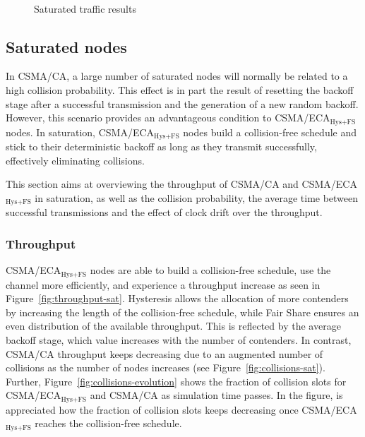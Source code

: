 \begin{figure}[tb]
		\\
		\caption{Saturated traffic results}
		\label{fig:satTest}
	\end{figure}


	\subsection{Saturated nodes}\label{resultsSaturated}
	In CSMA/CA, a large number of saturated nodes will normally be related to a high collision probability. This effect is in part the result of resetting the backoff stage after a successful transmission and the generation of a new random backoff. However, this scenario provides an advantageous condition to CSMA/ECA$_{\text{Hys+FS}}$ nodes. In saturation, CSMA/ECA$_{\text{Hys+FS}}$ nodes build a collision-free schedule and stick to their deterministic backoff as long as they transmit successfully, effectively eliminating collisions.
	
	This section aims at overviewing the throughput of CSMA/CA and CSMA/ECA$_{\text{Hys+FS}}$ in saturation, as well as the collision probability, the average time between successful transmissions and the effect of clock drift over the throughput.
	\\
	\subsubsection{Throughput}
	CSMA/ECA$_{\text{Hys+FS}}$ nodes are able to build a collision-free schedule, use the channel more efficiently, and experience a throughput increase as seen in Figure~\ref{fig:throughput-sat}. Hysteresis allows the allocation of more contenders by increasing the length of the collision-free schedule, while Fair Share ensures an even distribution of the available throughput. This is reflected by the average backoff stage, which value increases with the number of contenders. In contrast, CSMA/CA throughput keeps decreasing due to an augmented number of collisions as the number of nodes increases (see Figure~\ref{fig:collisions-sat}). Further, Figure~\ref{fig:collisions-evolution} shows the fraction of collision slots for CSMA/ECA$_{\text{Hys+FS}}$ and CSMA/CA as simulation time passes. In the figure, is appreciated how the fraction of collision slots keeps decreasing once CSMA/ECA$_{\text{Hys+FS}}$ reaches the collision-free schedule.


